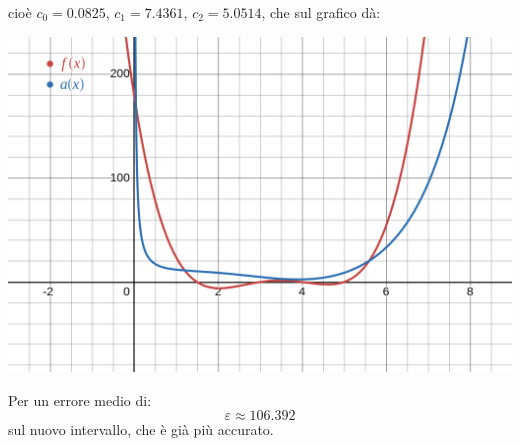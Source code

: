 \documentclass[a4paper,11pt]{article}
\begin{document}
\begin{minipage}{\textwidth}
cioè $c_0 = 0.0825$, $c_1 = 7.4361$, $c_2 = 5.0514$, che sul grafico dà:
\begin{center}
	\includegraphics[scale = 0.28]{../figures/trasc_approx_better.png}
\end{center}
\end{minipage}

\par\medskip

Per un errore medio di:
$$
\varepsilon \approx 106.392
$$
sul nuovo intervallo, che è già più accurato.
\end{document}

